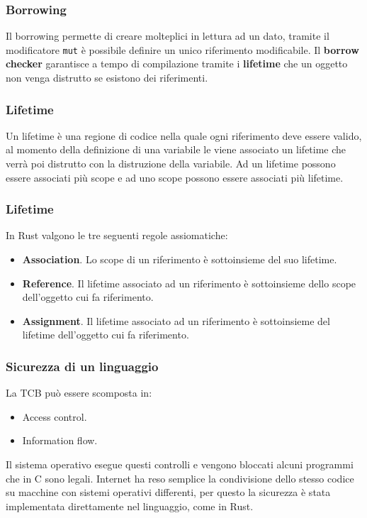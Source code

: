 \documentclass{beamer}
\newcommand{\textcode}[1]{\colorbox{backcolour}{\texttt{#1}}}
\begin{document}
\begin{frame}
    \frametitle{Borrowing}
    Il borrowing permette di creare molteplici in lettura ad un dato, tramite il modificatore \textcode{mut} è possibile definire un unico riferimento modificabile.
    Il \textbf{borrow checker} garantisce a tempo di compilazione tramite i \textbf{lifetime} che un oggetto non venga distrutto se esistono dei riferimenti.
\end{frame}

\begin{frame}
    \frametitle{Lifetime}
    Un lifetime è una regione di codice nella quale ogni riferimento deve essere valido, al momento della definizione di una variabile le viene associato un lifetime che verrà poi distrutto con la distruzione della variabile.
    Ad un lifetime possono essere associati più scope e ad uno scope possono essere associati più lifetime.
\end{frame}

\begin{frame}
    \frametitle{Lifetime}
    In Rust valgono le tre seguenti regole assiomatiche:
    \begin{itemize}
        \item \textbf{Association}. Lo scope di un riferimento è sottoinsieme del suo lifetime. 
        \item \textbf{Reference}. Il lifetime associato ad un riferimento è sottoinsieme dello scope dell'oggetto cui fa riferimento.  
        \item \textbf{Assignment}. Il lifetime associato ad un riferimento è sottoinsieme del lifetime dell'oggetto cui fa riferimento.
    \end{itemize}
\end{frame}

\begin{frame}
    \frametitle{Sicurezza di un linguaggio}
    La TCB può essere scomposta in: 
    \begin{itemize}
        \item Access control.
        \item Information flow.
    \end{itemize}
    Il sistema operativo esegue questi controlli e vengono bloccati alcuni programmi che in C sono legali. 
    Internet ha reso semplice la condivisione dello stesso codice su macchine con sistemi operativi differenti, per questo la sicurezza è stata implementata direttamente nel linguaggio, come in Rust.
\end{frame}
\end{document}

